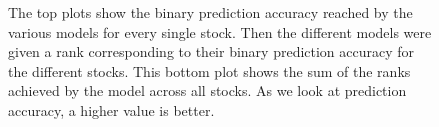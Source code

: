 \begin{figure}[h!]
    \centering
    \begin{adjustbox}{width = 0.95\linewidth}
    
    \end{adjustbox}
    \vspace{1ex}
    \begin{adjustbox}{width = 0.95\linewidth}
    
    \end{adjustbox}
    \caption{The top plots show the binary prediction accuracy reached by the various models for every single stock. Then the different models were given a rank corresponding to their binary prediction accuracy for the different stocks. This bottom plot shows the sum of the ranks achieved by the model across all stocks. As we look at prediction accuracy, a higher value is better.}
    \label{fig:models_ranked_binary}
\end{figure}

